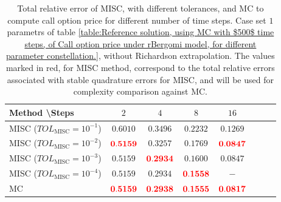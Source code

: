 \FloatBarrier


\begin{table}[h!]
	\centering
	\begin{tabular}{l*{6}{c}r}
		Method \textbackslash  Steps            & $2$ & $4$ & $8$ & $16$  \\
		\hline
		MISC ($TOL_{\text{MISC}}=10^{-1}$)  & $\mathbf{0.6010}$ & $\mathbf{0.3496}$ & $\mathbf{  0.2232}$ & $\mathbf{
			0.1269}$  \\
		MISC ($TOL_{\text{MISC}}=10^{-2}$)  & $\mathbf{{\color{red}0.5159}}$ & $\mathbf{0.3257}$ & $\mathbf{ 0.1769}$ & $\mathbf{  {\color{red}0.0847}}$  \\
		MISC ($TOL_{\text{MISC}}=10^{-3}$)  & $\mathbf{0.5159}$ & $\mathbf{{\color{red}0.2934}}$ & $\mathbf{0.1600}$ & $\mathbf{0.0847}$  \\
		MISC ($TOL_{\text{MISC}}=10^{-4}$)  & $\mathbf{0.5159}$ & $\mathbf{0.2934}$ & $\mathbf{{\color{red}0.1558}}$ & $\mathbf{-}$  \\
		\hline
		MC     & $\mathbf{{\color{red}0.5159}}$ & $\mathbf{{\color{red}0.2938}}$ & $\mathbf{{\color{red}0.1555}}$ &$\mathbf{  {\color{red}0.0817}}$  \\	
		
		\hline
	\end{tabular}
	\caption{Total relative error of MISC, with different tolerances,  and MC to compute call option price for different number of time steps. Case  set $1$ parametrs of table \ref{table:Reference solution, using MC with $500$ time steps, of Call option price under rBergomi model, for different parameter constellation.}, without Richardson extrapolation. The values marked in red, for MISC method, correspond to the total relative errors associated with  stable quadrature errors for MISC, and will be used for complexity comparison against MC.}
	\label{Total error of MISC and MC to compute Call option price of the different tolerances for different number of time steps. Case set 1, without Richardson extrapolation. The numbers between parentheses are the corresponding absolute errors.}
\end{table}




